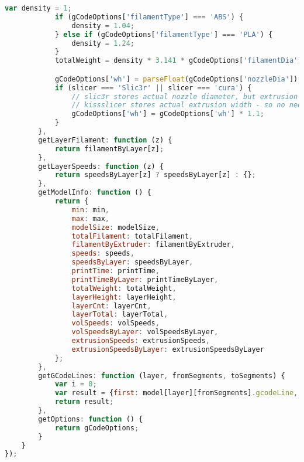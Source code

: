 \begin{lstlisting}[language=JavaScript, label={lst:gcodeFactory}, caption=gcodeFactory.js is the main gcode header parsing code.]
            var density = 1;
            if (gCodeOptions['filamentType'] === 'ABS') {
                density = 1.04;
            } else if (gCodeOptions['filamentType'] === 'PLA') {
                density = 1.24;
            }
            totalWeight = density * 3.141 * gCodeOptions['filamentDia'] / 10 * gCodeOptions['filamentDia'] / 10 / 4 * totalFilament / 10;

            gCodeOptions['wh'] = parseFloat(gCodeOptions['nozzleDia']) / parseFloat(layerHeight);
            if (slicer === 'Slic3r' || slicer === 'cura') {
                // slic3r stores actual nozzle diameter, but extrusion is usually slightly thicker, here we compensate for that
                // kissslicer stores actual extrusion width - so no need for that.
                gCodeOptions['wh'] = gCodeOptions['wh'] * 1.1;
            }
        },
        getLayerFilament: function (z) {
            return filamentByLayer[z];
        },
        getLayerSpeeds: function (z) {
            return speedsByLayer[z] ? speedsByLayer[z] : {};
        },
        getModelInfo: function () {
            return {
                min: min,
                max: max,
                modelSize: modelSize,
                totalFilament: totalFilament,
                filamentByExtruder: filamentByExtruder,
                speeds: speeds,
                speedsByLayer: speedsByLayer,
                printTime: printTime,
                printTimeByLayer: printTimeByLayer,
                totalWeight: totalWeight,
                layerHeight: layerHeight,
                layerCnt: layerCnt,
                layerTotal: layerTotal,
                volSpeeds: volSpeeds,
                volSpeedsByLayer: volSpeedsByLayer,
                extrusionSpeeds: extrusionSpeeds,
                extrusionSpeedsByLayer: extrusionSpeedsByLayer
            };
        },
        getGCodeLines: function (layer, fromSegments, toSegments) {
            var i = 0;
            var result = {first: model[layer][fromSegments].gcodeLine, last: model[layer][toSegments].gcodeLine};
            return result;
        },
        getOptions: function () {
            return gCodeOptions;
        }
    }
});
\end{lstlisting}


